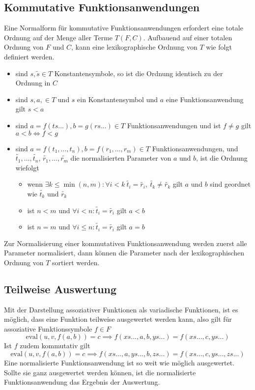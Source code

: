 \documentclass{article}
\begin{document}
\subsection{Kommutative Funktionsanwendungen}
Eine Normalform für kommutative Funktionsanwendungen erfordert eine totale Ordnung auf der Menge aller Terme $T(F, C)$. Aufbauend auf einer totalen Ordnung von $F$ und $C$, kann eine lexikographische Ordnung von $T$ wie folgt definiert werden. 
\begin{itemize}
	\item{sind $s, \tilde{s} \in T$ Konstantensymbole, so ist die Ordnung identisch zu der Ordnung in $C$}
	\item{sind $s, a, \in T$ und $s$ ein Konstantensymbol und $a$ eine Funktionsanwendung gilt $s < a$ }
	\item{sind $a = f(ts...), b = g(rs...) \in T$ Funktionsanwendungen und ist $f \neq g$ gilt $a < b \iff f < g $}
	\item{sind $a = f(t_1, \dots, t_n), b = f(r_1, \dots, r_m) \in T$ Funktionsanwendungen, und $\tilde{t_1}, \dots, \tilde{t_n}$, $\tilde{r_1}, \dots, \tilde{r_m}$ die normalisierten Parameter von $a$ und $b$, ist die Ordnung wiefolgt}
	\begin{itemize}
		\item{wenn $\exists k \leq \min{(n, m)} \colon \forall i < k ~ \tilde{t_i} = \tilde{r_i} ,~ \tilde{t_k} \neq \tilde{r_k} $ gilt $a$ und $b$ sind geordnet wie $\tilde{t_k}$ und $\tilde{r_k}$}
		\item{ist $n < m$ und $\forall i < n\colon \tilde{t_i} = \tilde{r_i}$ gilt $a < b$}
		\item{ist $n = m$ und $\forall i \leq n\colon \tilde{t_i} = \tilde{r_i}$ gilt $a = b$}
	\end{itemize}
\end{itemize}
Zur Normalisierung einer kommutativen Funktionsanwendung werden zuerst alle Parameter normalisiert, dann können die Parameter nach der lexikographischen Ordnung von $T$ sortiert werden.

\subsection{Teilweise Auswertung}
Mit der Darstellung assoziativer Funktionen als variadische Funktionen, ist es möglich, dass eine Funktion teilweise ausgewertet werden kann, also gilt für assoziative Funktionssymbole $f \in F$
$$\mathrm{eval}(u, v, f(a, b)) = c \implies f(xs..., a, b, ys...) = f(xs..., c, ys...)$$
Ist $f$ zudem kommutativ gilt 
$$\mathrm{eval}(u, v, f(a, b)) = c \implies f(xs..., a, ys..., b, zs...) = f(xs..., c, ys..., zs...)$$
Eine normalisierte Funktionsanwendung ist so weit wie möglich ausgewertet. Sollte sie ganz ausgewertet werden können, ist die normalisierte Funktionsanwendung das Ergebnis der Auswertung.
\end{document}
